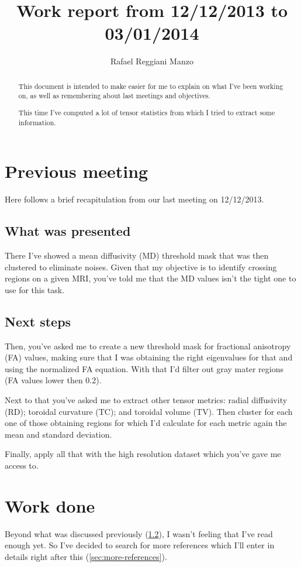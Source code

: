 \documentclass[a4paper,11pt]{report}
\title{Work report from 12/12/2013 to 03/01/2014}
\author{Rafael Reggiani Manzo}
\begin{document}
\maketitle
\tableofcontents

\begin{abstract}
  This document is intended to make easier for me to explain on what I've been working on, as well as remembering about last meetings and objectives.

  This time I've computed a lot of tensor statistics from which I tried to extract some information.
\end{abstract}

\chapter{Previous meeting}
Here follows a brief recapitulation from our last meeting on 12/12/2013.

  \section{What was presented}
  There I've showed a mean diffusivity (MD) threshold mask that was then clustered to eliminate noises. Given that my objective is to identify crossing regions on a given MRI, you've told me that the MD values isn't the tight one to use for this task.

  \section{Next steps}\label{sec:next-steps}
  Then, you've asked me to create a new threshold mask for fractional anisotropy (FA) values, making sure that I was obtaining the right eigenvalues for that and using the normalized FA equation. With that I'd filter out gray mater regions (FA values lower then 0.2).

  Next to that you've asked me to extract other tensor metrics: radial diffusivity (RD); toroidal curvature (TC); and toroidal volume (TV). Then cluster for each one of those obtaining regions for which I'd calculate for each metric again the mean and standard deviation.

  Finally, apply all that with the high resolution dataset which you've gave me access to.

\chapter{Work done}
Beyond what was discussed previously (\ref{sec:next-steps}), I wasn't feeling that I've read enough yet. So I've decided to search for more references which I'll enter in details right after this (\ref{sec:more-references}).
\end{document}
